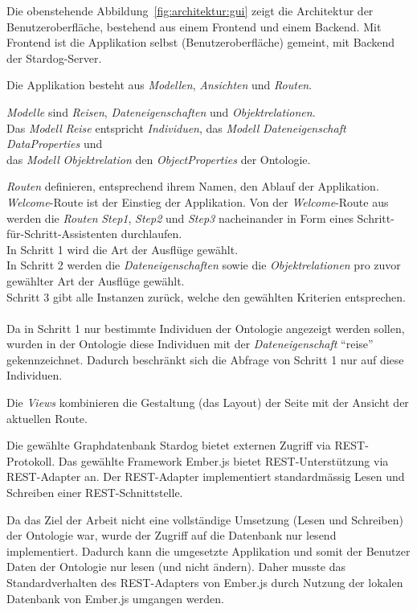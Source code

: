 Die obenstehende Abbildung~\ref{fig:architektur:gui} zeigt die Architektur der Benutzeroberfläche, bestehend aus einem Frontend und einem Backend. Mit Frontend ist die Applikation selbst (Benutzeroberfläche) gemeint, mit Backend der Stardog-Server.

Die Applikation besteht aus \textit{Modellen}, \textit{Ansichten} und \textit{Routen}.

\textit{Modelle} sind \textit{Reisen}, \textit{Dateneigenschaften} und \textit{Objektrelationen}.\\
\hangindent=1.5cm Das \textit{Modell} \textit{Reise} entspricht \textit{Individuen}, das \textit{Modell} \textit{Dateneigenschaft} \textit{DataProperties} und\\
das \textit{Modell} \textit{Objektrelation} den \textit{ObjectProperties} der Ontologie.

\textit{Routen} definieren, entsprechend ihrem Namen, den Ablauf der Applikation.\\
\hangindent=1.5cm \textit{Welcome}-Route ist der Einstieg der Applikation. Von der \textit{Welcome}-Route aus werden die \textit{Routen} \textit{Step1}, \textit{Step2} und \textit{Step3} nacheinander in Form eines Schritt-für-Schritt-Assistenten durchlaufen.\\
In Schritt 1 wird die Art der Ausflüge gewählt.\\
In Schritt 2 werden die \textit{Dateneigenschaften} sowie die \textit{Objektrelationen} pro zuvor gewählter Art der Ausflüge gewählt.\\
Schritt 3 gibt alle Instanzen zurück, welche den gewählten Kriterien entsprechen.\\
\\
Da in Schritt 1 nur bestimmte Individuen der Ontologie angezeigt werden sollen, wurden in der Ontologie diese Individuen mit der \textit{Dateneigenschaft} ``reise'' gekennzeichnet. Dadurch beschränkt sich die Abfrage von Schritt 1 nur auf diese Individuen.

Die \textit{Views} kombinieren die Gestaltung (das Layout) der Seite mit der Ansicht der aktuellen Route.

Die gewählte Graphdatenbank Stardog bietet externen Zugriff via REST-Protokoll. Das gewählte Framework Ember.js bietet REST-Unterstützung via REST-Adapter an. Der REST-Adapter implementiert standardmässig Lesen und Schreiben einer REST-Schnittstelle.

Da das Ziel der Arbeit nicht eine vollständige Umsetzung (Lesen und Schreiben) der Ontologie war, wurde der Zugriff auf die Datenbank nur lesend implementiert. Dadurch kann die umgesetzte Applikation und somit der Benutzer Daten der Ontologie nur lesen (und nicht ändern). Daher musste das Standardverhalten des REST-Adapters von Ember.js durch Nutzung der lokalen Datenbank von Ember.js umgangen werden.

